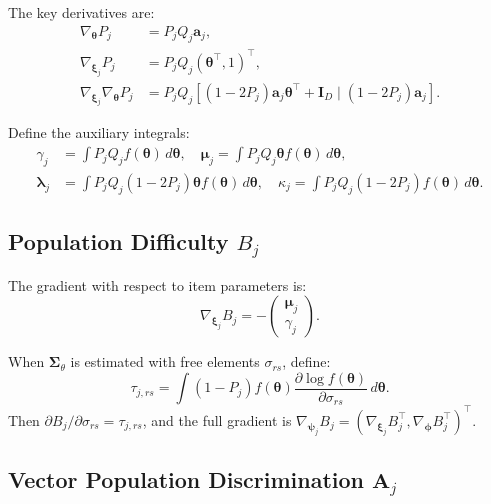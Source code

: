 \documentclass[man, 12pt, floatsintext]{apa7}
\begin{document}
The key derivatives are:
\begin{align*}
\nabla_{\boldsymbol{\theta}} P_j &= P_j Q_j \mathbf{a}_j, \\
\nabla_{\boldsymbol{\xi}_j} P_j &= P_j Q_j (\boldsymbol{\theta}^\top, 1)^\top, \\
\nabla_{\boldsymbol{\xi}_j}\nabla_{\boldsymbol{\theta}} P_j &= P_j Q_j \left[(1 - 2P_j) \mathbf{a}_j \boldsymbol{\theta}^\top + \mathbf{I}_D \;\Big|\; (1 - 2P_j) \mathbf{a}_j\right].
\end{align*}

Define the auxiliary integrals:
\begin{equation}\label{eq:aux-integrals}
\begin{aligned}
\gamma_j &= \int P_j Q_j f(\boldsymbol{\theta})\, d\boldsymbol{\theta}, \quad
\boldsymbol{\mu}_j = \int P_j Q_j \boldsymbol{\theta} f(\boldsymbol{\theta})\, d\boldsymbol{\theta}, \quad \\
\boldsymbol{\lambda}_j &= \int P_j Q_j (1 - 2P_j) \boldsymbol{\theta} f(\boldsymbol{\theta})\, d\boldsymbol{\theta}, \quad
\kappa_j = \int P_j Q_j (1 - 2P_j) f(\boldsymbol{\theta})\, d\boldsymbol{\theta}.
\end{aligned}
\end{equation}

\subsection{Population Difficulty $B_j$}

The gradient with respect to item parameters is:
$$\nabla_{\boldsymbol{\xi}_j} B_j = -\begin{pmatrix} \boldsymbol{\mu}_j \\ \gamma_j \end{pmatrix}.$$

When $\boldsymbol{\Sigma}_\theta$ is estimated with free elements $\sigma_{rs}$, define:
$$\tau_{j,rs} = \int (1 - P_j) f(\boldsymbol{\theta}) \frac{\partial \log f(\boldsymbol{\theta})}{\partial \sigma_{rs}}\, d\boldsymbol{\theta}.$$
Then $\partial B_j/\partial \sigma_{rs} = \tau_{j,rs}$, and the full gradient is $\nabla_{\boldsymbol{\psi}_j} B_j = (\nabla_{\boldsymbol{\xi}_j} B_j^\top, \nabla_{\boldsymbol{\phi}} B_j^\top)^\top$.

\subsection{Vector Population Discrimination $\mathbf{A}_j$}
\end{document}
